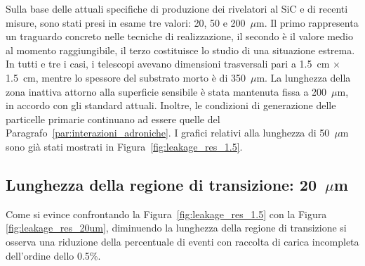 Sulla base delle attuali specifiche di produzione dei rivelatori al SiC e di recenti misure, sono stati presi in esame tre valori: 20, 50 e 200~$\mu$m.
Il primo rappresenta un traguardo concreto nelle tecniche di realizzazione, il secondo è il valore medio al momento raggiungibile, il terzo costituisce lo studio di una situazione estrema.
In tutti e tre i casi, i telescopi avevano dimensioni trasversali pari a 1.5~cm $\times$ 1.5~cm, mentre lo spessore del substrato morto è di 350~$\mu$m.
La lunghezza della zona inattiva attorno alla superficie sensibile è stata mantenuta fissa a 200~$\mu$m, in accordo con gli standard attuali.
Inoltre, le condizioni di generazione delle particelle primarie continuano ad essere quelle del Paragrafo~\ref{par:interazioni_adroniche}.
I grafici relativi alla lunghezza di 50~$\mu$m sono già stati mostrati in Figura~\ref{fig:leakage_res_1.5}.



\subsection*{Lunghezza della regione di transizione: 20~$\mu$m}

Come si evince confrontando la Figura~\ref{fig:leakage_res_1.5} con la Figura~ \ref{fig:leakage_res_20um}, diminuendo la lunghezza della regione di transizione si osserva una riduzione della percentuale di eventi con raccolta di carica incompleta dell'ordine dello 0.5\%.



